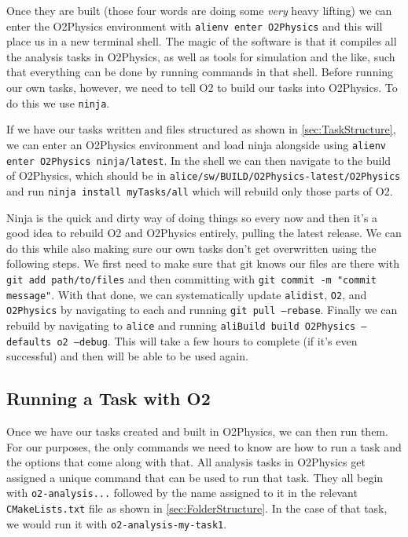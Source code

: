 Once they are built (those four words are doing some \textit{very} heavy lifting) we can enter the O2Physics environment with \texttt{alienv enter O2Physics} and this will place us in a new terminal shell. The magic of the software is that it compiles all the analysis tasks in O2Physics, as well as tools for simulation and the like, such that everything can be done by running commands in that shell. Before running our own tasks, however, we need to tell O2 to build our tasks into O2Physics. To do this we use \texttt{ninja}.

If we have our tasks written and files structured as shown in \cref{sec:TaskStructure}, we can enter an O2Physics environment and load ninja alongside using \texttt{alienv enter O2Physics ninja/latest}. In the shell we can then navigate to the build of O2Physics, which should be in \texttt{alice/sw/BUILD\-/O2Physics-latest/O2Physics} and run \texttt{ninja install myTasks/all} which will rebuild only those parts of O2. 

Ninja is the quick and dirty way of doing things so every now and then it's a good idea to rebuild O2 and O2Physics entirely, pulling the latest release. We can do this while also making sure our own tasks don't get overwritten using the following steps. We first need to make sure that git knows our files are there with \texttt{git add path/to/files} and then committing with \texttt{git commit -m "commit message"}. With that done, we can systematically update \texttt{alidist}, \texttt{O2}, and \texttt{O2Physics} by navigating to each and running \texttt{git pull --rebase}. Finally we can rebuild by navigating to \texttt{alice} and running \texttt{aliBuild build O2Physics --defaults o2 --debug}. This will take a few hours to complete (if it's even successful) and then will be able to be used again.

\subsection{Running a Task with O2}\label{sec:RunO2}
Once we have our tasks created and built in O2Physics, we can then run them. For our purposes, the only commands we need to know are how to run a task and the options that come along with that. All analysis tasks in O2Physics get assigned a unique command that can be used to run that task. They all begin with \texttt{o2-analysis...} followed by the name assigned to it in the relevant \texttt{CMakeLists.txt} file as shown in \cref{sec:FolderStructure}. In the case of that task, we would run it with \texttt{o2-analysis-my-task1}. 

